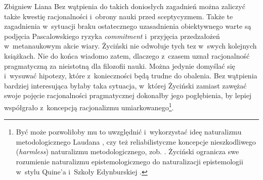 \begin{artplenv}{Zbigniew Liana}
Bez wątpienia do takich doniosłych zagadnień można zaliczyć także kwestię racjonalności i~obrony nauki przed sceptycyzmem. Także te zagadnienia w~sytuacji braku ostatecznego uzasadnienia obiektywnego warte są podjęcia Pascalowskiego ryzyka \textit{commitment} i~przyjęcia przedzałożeń w~metanaukowym akcie wiary. Życiński nie odwołuje tych tez w~swych kolejnych książkach. Nie do końca wiadomo zatem, dlaczego z~czasem uznał racjonalność pragmatyczną za nieistotną dla filozofii nauki. Można jedynie domyślać się i~wysuwać hipotezy, które z~konieczności będą trudne do obalenia. Bez wątpienia bardziej interesująca byłaby taka sytuacja, w~której Życiński zamiast zawężać swoje pojęcie racjonalności pragmatycznej dokonałby jego pogłębienia, by lepiej współgrało z~koncepcją racjonalizmu umiarkowanego\footnote{Być może pozwoliłoby mu to uwzględnić i~wykorzystać ideę naturalizmu metodologicznego Laudana
\parencite*[][]{laudan_progress_1987}, %
 czy też reliabilistyczne koncepcje nieszkodliwego (\textit{harmless}) naturalizmu metodologicznego, zob. 
\parencites[][]{almeder_harmless_1998}[][s.~136nn]{liana_naturalistyczne_2003}. %
 Życiński ogranicza swe rozumienie naturalizmu epistemologicznego do naturalizacji epistemologii w~stylu Quine'a i~Szkoły Edynburskiej 
\parencites[zob. np.][s.~228]{zycinski_teizm_1985}[][s.~134.157nn]{zycinski_elementy_1996}[][s.~181.214nn]{zycinski_elementy_2015}.%
}.


\end{artplenv}
